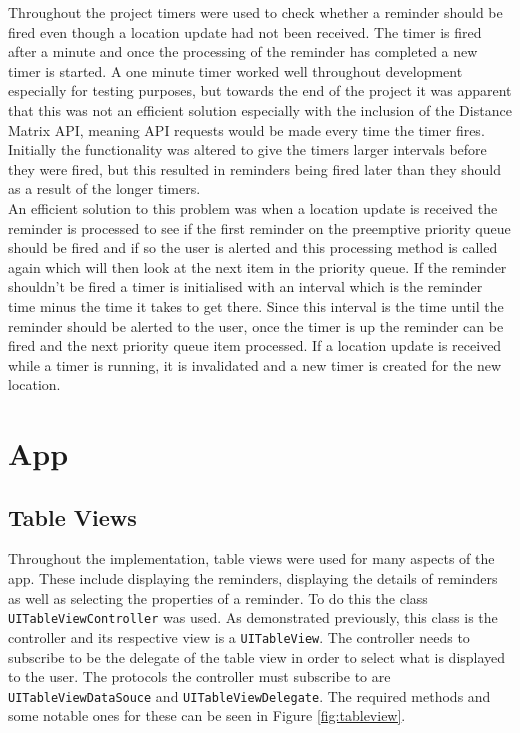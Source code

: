 \documentclass[12pt]{report}
\begin{document}
Throughout the project timers were used to check whether a reminder should be fired even though a location update had not been received. The timer is fired after a minute and once the processing of the reminder has completed a new timer is started. A one minute timer worked well throughout development especially for testing purposes, but towards the end of the project it was apparent that this was not an efficient solution especially with the inclusion of the Distance Matrix API, meaning API requests would be made every time the timer fires. Initially the functionality was altered to give the timers larger intervals before they were fired, but this resulted in reminders being fired later than they should as a result of the longer timers.\\

An efficient solution to this problem was when a location update is received the reminder is processed to see if the first reminder on the preemptive priority queue should be fired and if so the user is alerted and this processing method is called again which will then look at the next item in the priority queue. If the reminder shouldn't be fired a timer is initialised with an interval which is the reminder time minus the time it takes to get there. Since this interval is the time until the reminder should be alerted to the user, once the timer is up the reminder can be fired and the next priority queue item processed. If a location update is received while a timer is running, it is invalidated and a new timer is created for the new location. 

\section{App}

\subsection{Table Views}

Throughout the implementation, table views were used for many aspects of the app. These include displaying the reminders, displaying the details of reminders as well as selecting the properties of a reminder. To do this the class \texttt{UITableViewController} was used. As demonstrated previously, this class is the controller and its respective view is a \texttt{UITableView}. The controller needs to subscribe to be the delegate of the table view in order to select what is displayed to the user. The protocols the controller must subscribe to are \texttt{UITableViewDataSouce} and \texttt{UITableViewDelegate}. The required methods and some notable ones for these can be seen in Figure \ref{fig:tableview}.
\end{document}
